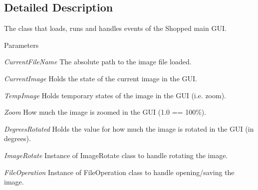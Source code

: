 \subsection{Detailed Description}
The class that loads, runs and handles events of the Shopped main GUI. 
\begin{DoxyParams}{Parameters}
\item[{\em CurrentFileName}]The absolute path to the image file loaded. \item[{\em CurrentImage}]Holds the state of the current image in the GUI. \item[{\em TempImage}]Holds temporary states of the image in the GUI (i.e. zoom). \item[{\em Zoom}]How much the image is zoomed in the GUI (1.0 == 100\%). \item[{\em DegreesRotated}]Holds the value for how much the image is rotated in the GUI (in degrees). \item[{\em ImageRotate}]Instance of ImageRotate class to handle rotating the image. \item[{\em FileOperation}]Instance of FileOperation class to handle opening/saving the image. \end{DoxyParams}


